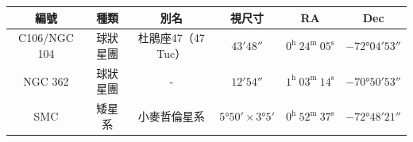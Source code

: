 \begin{center}
\begin{longtable}{c | c | c | c | c | c}
    編號 & 種類 & 別名 & 視尺寸 & RA & Dec \\
    \hline
    \endfirsthead


    \endfoot

    \endlastfoot

    C106/NGC 104 & 球狀星團 & 杜鵑座47（47 Tuc） & \(\ang{;43;48}\) & \(0^\text{h }24^\text{m }05^\text{s}\) & \(-\ang{72;04;53}\) \\ %
    NGC 362 & 球狀星團 & - & \(\ang{;12;54}\) & \(1^\text{h }03^\text{m }14^\text{s}\) & \(-\ang{70;50;53}\) \\ %
    SMC & 矮星系 & 小麥哲倫星系 & \(\ang{5;50}\times\ang{3;5}\) & \(0^\text{h }52^\text{m }37^\text{s}\) & \(-\ang{72;48;21}\) \\ %

\end{longtable}
\end{center}

